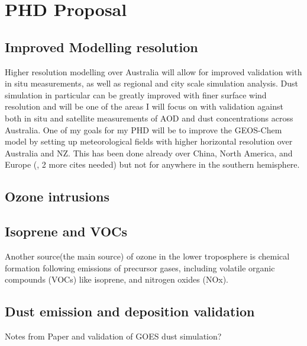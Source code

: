\section{PHD Proposal}

\subsection{Improved Modelling resolution}
Higher resolution modelling over Australia will allow for improved validation with in situ measurements, as well as regional and city scale simulation analysis. 
Dust simulation in particular can be greatly improved with finer surface wind resolution and will be one of the areas I will focus on with validation against both in situ and satellite measurements of AOD and dust concentrations across Australia.
One of my goals for my PHD will be to improve the GEOS-Chem model by setting up meteorological fields with higher horizontal resolution over Australia and NZ.
This has been done already over China, North America, and Europe (\cite{Chen_2009}, 2 more cites needed) but not for anywhere in the southern hemisphere.

\subsection{Ozone intrusions}

\subsection{Isoprene and VOCs}
Another source(the main source) of ozone in the lower troposphere is chemical formation following emissions of precursor gases, including volatile organic compounds (VOCs) like isoprene, and nitrogen oxides (NOx).

\subsection{Dust emission and deposition validation}
Notes from Paper and validation of GOES dust simulation?

  